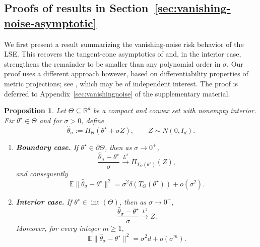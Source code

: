 \documentclass[11pt]{article}
\theoremstyle{plain}
\newtheorem{proposition}[theorem]{Proposition}
\theoremstyle{definition}
\providecommand{\mathbbm}{\mathbb} %
\newcommand{\R}{\mathbbm{R}}
\newcommand{\E}{\mathbb{E}}
\newcommand{\hattheta}{\hat{\theta}}
\begin{document}
\subsection{Proofs of results in Section~\ref{sec:vanishing-noise-asymptotic}}
We first present a result summarizing the vanishing-noise risk behavior of the LSE. This recovers the tangent-cone asymptotics of
\cite[Theorem~3.1]{oymak2016sharp} and, in the interior case, strengthens the remainder to be smaller than any polynomial order in $\sigma$. Our proof uses a different approach however, based on differentiability properties of metric projections; see \cite{zarantonello1971projections}, which may be of independent
interest. The proof is deferred to Appendix~\ref{sec:vanishingnoise} of the supplementary material.


\begin{proposition}\label{prop:smallSigmaGeneral}
Let $\Theta \subseteq \R^d$ be a compact and convex set with nonempty interior. Fix $\theta^\star\in\Theta$ and for $\sigma>0$, define
\[
\hattheta_\sigma := \Pi_\Theta(\theta^\star+\sigma Z),
\qquad Z\sim N(0,I_d).
\]
\begin{enumerate}
\item[\textup{(i)}] \textbf{Boundary case.}
If $\theta^\star\in\partial\Theta$, then as $\sigma\to 0^+$,
\begin{equation}\label{eq:scaled-boundary-L2-v2}
\frac{\hattheta_\sigma-\theta^\star}{\sigma}
\stackrel{L^2}{\longrightarrow} \Pi_{T_\Theta(\theta^\star)}(Z),
\end{equation}
and consequently
\begin{equation}\label{eq:risk-boundary-v2}
\E\|\hattheta_\sigma-\theta^\star\|^2
=
\sigma^2\delta (T_{\Theta}(\theta^\star))
+
o(\sigma^2).
\end{equation}

\item[\textup{(ii)}] \textbf{Interior case.}
If $\theta^\star\in\operatorname{int}(\Theta)$, then as $\sigma\to 0^+$,
\begin{equation}\label{eq:scaled-interior-L2-v2}
\frac{\hattheta_\sigma-\theta^\star}{\sigma}
\stackrel{L^2}{\longrightarrow}  Z.
\end{equation}
Moreover, for every integer $m\ge 1$,
\begin{equation}\label{eq:risk-interior-superpoly-v2}
\E\|\hattheta_\sigma-\theta^\star\|^2
=
\sigma^2 d
+
o(\sigma^m).
\end{equation}
\end{enumerate}
\end{proposition}
\end{document}
